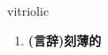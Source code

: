
\begin{frame}
{\huge vitriolic}
\begin{center}
\begin{enumerate}\Large
  \item \textbf{(言辞)刻薄的}
\end{enumerate}
\end{center}
\end{frame}
